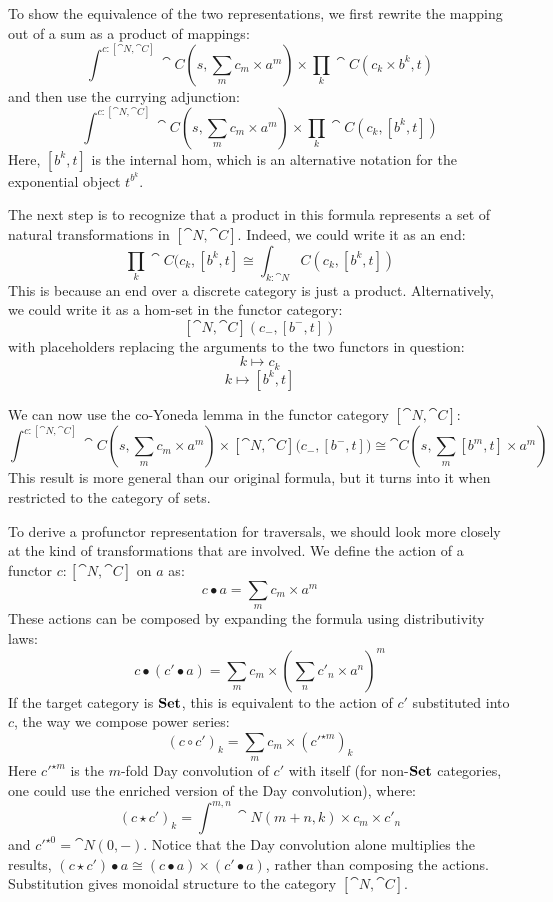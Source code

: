 \documentclass[DaoFP]{subfiles}
\begin{document}
To show the equivalence of the two representations, we first rewrite the mapping out of a sum as a product of mappings:
\[\int^{c \colon [\cat N, \cat C]} \cat C (s, \sum_m c_m \times a^m) \times \prod_k \cat C (c_k \times b^k, t) \]
and then use the currying adjunction:
\[\int^{c \colon [\cat N, \cat C]} \cat C (s, \sum_m c_m \times a^m) \times \prod_k \cat C (c_k,  [b^k, t]) \]
Here, $[b^k, t]$ is the internal hom, which is an alternative notation for the exponential object $t^{b^k}$.

The next step is to recognize that a product in this formula represents a set of natural transformations in $[\cat N, \cat C]$. Indeed, we could write it as an end:
 \[ \prod_k \cat C (c_k,  [b^k, t] \cong \int_{k : \cat N} C (c_k,  [b^k, t]) \]
This is because an end over a discrete category is just a product. Alternatively, we could write it as a hom-set in the functor category:
\[ [\cat N, \cat C](c_{-}, [b^{-}, t]) \]
with placeholders replacing the arguments to the two functors in question:
\[ k \mapsto c_k \]
\[ k \mapsto [b^k, t] \]

We can now use the co-Yoneda lemma in the functor category $[\cat N, \cat C]$:
\[\int^{c \colon [\cat N, \cat C]} \cat C (s, \sum_m c_m \times a^m) \times  [\cat N, \cat C]\big(c_{-}, [b^{-}, t]\big) \cong \cat C(s, \sum_m [b^m, t] \times a^m)\]
This result is more general than our original formula, but it turns into it when restricted to the category of sets.

To derive a profunctor representation for traversals, we should look more closely at the kind of transformations that are involved. We define the action of a functor $c \colon [\cat N, \cat C]$ on $a$ as:
\[ c \bullet a = \sum_m c_m \times a^m \]
These actions can be composed by expanding the formula using distributivity laws:
\[ c \bullet (c' \bullet a) = \sum_m c_m \times (\sum_n c'_n \times a^n)^m \]
If the target category is $\mathbf{Set}$, this is equivalent to the action of $c'$ substituted into $c$, the way we compose power series:
\[ (c \circ c')_k = \sum_m c_m \times (c'^{\star m})_k \]
Here $c'^{\star m}$ is the $m$-fold Day convolution of $c'$ with itself (for non-$\mathbf{Set}$ categories, one could use the enriched version of the Day convolution), where:
\[ (c \star c')_k = \int^{m, n} \cat N (m + n, k) \times c_m \times c'_n \]
and $c'^{\star 0} = \cat N (0, -)$. Notice that the Day convolution alone multiplies the results, $(c \star c') \bullet a \cong (c \bullet a) \times (c' \bullet a)$, rather than composing the actions. Substitution gives monoidal structure to the category $[\cat N, \cat C]$. 
\end{document}
